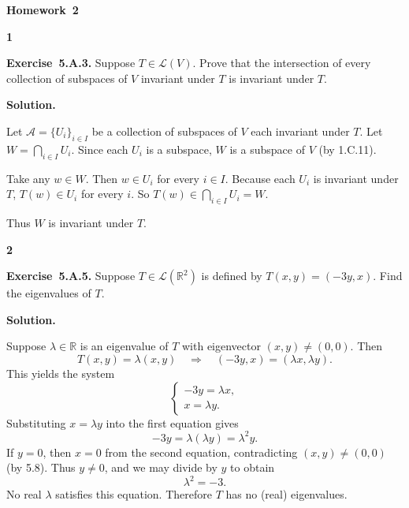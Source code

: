 \documentclass[11pt]{article}
\newcommand{\AssignmentType}{Homework} %
\newcommand{\AssignmentNumber}{2}
\newcommand{\ProblemDivider}[1]{%
  \vspace{1.0em}
  \noindent\textbf{#1}\par
  \vspace{0.35em}
}
\newcommand{\ProblemAnnounce}{\noindent}
\newcommand{\SolutionAnnounce}{\noindent\textbf{Solution.}\par\medskip}
\newcommand{\Exercise}[1]{\textbf{Exercise~#1.}\;}
\newcommand{\R}{\mathbb{R}}
\newcommand{\Lmap}{\mathcal{L}}
\begin{document}
\begin{center}
  {\Large \textbf{\AssignmentType~\AssignmentNumber}}
\end{center}
\vspace{0.75em}

\ProblemDivider{1}

\begin{problemBox}
\ProblemAnnounce
\Exercise{5.A.3}
Suppose \( T \in \Lmap(V) \). Prove that the intersection of every collection of
subspaces of \( V \) invariant under \( T \) is invariant under \( T \).
\end{problemBox}

\begin{solutionBox}
\SolutionAnnounce
\doublespacing

Let \(\mathcal{A} = \{U_i\}_{i \in I}\) be a collection of subspaces of \(V\) each invariant under \(T\). 
Let \(W = \bigcap_{i \in I} U_i\). Since each \(U_i\) is a subspace, \(W\) is a subspace of \(V\) (by 1.C.11). 

Take any \(w \in W\). Then \(w \in U_i\) for every \(i \in I\). Because each \(U_i\) is invariant under \(T\), 
\(T(w) \in U_i\) for every \(i\). So \(T(w) \in \bigcap_{i \in I} U_i = W\).

Thus \(W\) is invariant under \(T\).

\end{solutionBox}

\ProblemDivider{2}

\begin{problemBox}
\ProblemAnnounce
\Exercise{5.A.5}
Suppose \( T \in \Lmap(\R^2) \) is defined by \( T(x, y) = (-3y, x) \). Find the eigenvalues of \( T \).
\end{problemBox}

\begin{solutionBox}
\SolutionAnnounce
\doublespacing

Suppose \(\lambda \in \R\) is an eigenvalue of \(T\) with eigenvector \((x,y) \neq (0,0)\). Then
\[
T(x,y) = \lambda (x,y) \quad \Rightarrow \quad (-3y, x) = (\lambda x, \lambda y).
\]
This yields the system
\[
\begin{cases}
-3y = \lambda x,\\
x = \lambda y.
\end{cases}
\]
Substituting \(x = \lambda y\) into the first equation gives
\[
-3y = \lambda (\lambda y) = \lambda^2 y.
\]
If \(y = 0\), then \(x = 0\) from the second equation, contradicting \((x,y) \neq (0,0)\) (by 5.8). Thus \(y \neq 0\), and we may divide by \(y\) to obtain
\[
\lambda^2 = -3.
\]
No real \(\lambda\) satisfies this equation. Therefore \(T\) has no (real) eigenvalues.

\end{solutionBox}
\end{document}
